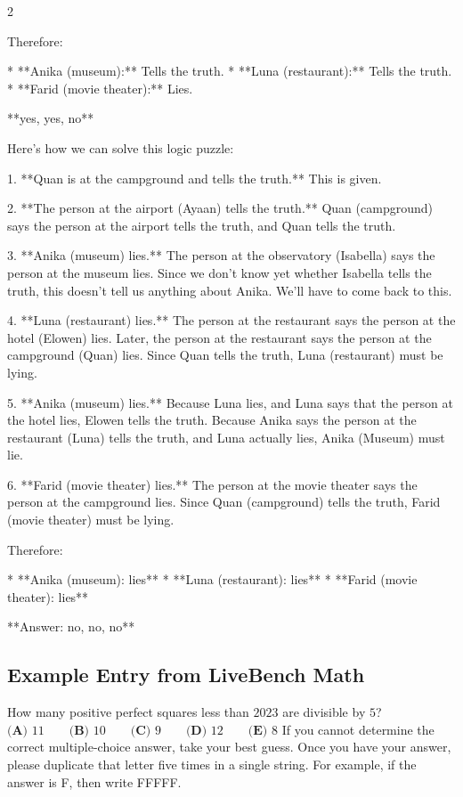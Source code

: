 \begin{paracol}{2}
\begin{tcolorbox}[breakable, colframe=mydarkgreen!70, colback=mydarkgreen!10, title=Correct response]
Therefore:

* **Anika (museum):** Tells the truth.
* **Luna (restaurant):** Tells the truth.
* **Farid (movie theater):** Lies.

**yes, yes, no**
\end{tcolorbox}

\switchcolumn
\begin{tcolorbox}[breakable, colframe=red!70, colback=red!10, title=Incorrect Response]
Here's how we can solve this logic puzzle:

1. **Quan is at the campground and tells the truth.** This is given.

2. **The person at the airport (Ayaan) tells the truth.** Quan (campground) says the person at the airport tells the truth, and Quan tells the truth.

3. **Anika (museum) lies.**  The person at the observatory (Isabella) says the person at the museum lies.  Since we don't know yet whether Isabella tells the truth, this doesn't tell us anything about Anika.  We'll have to come back to this.

4. **Luna (restaurant) lies.**  The person at the restaurant says the person at the hotel (Elowen) lies.  Later, the person at the restaurant says the person at the campground (Quan) lies.  Since Quan tells the truth, Luna (restaurant) must be lying.

5. **Anika (museum) lies.** Because Luna lies, and Luna says that the person at the hotel lies, Elowen tells the truth. Because Anika says the person at the restaurant (Luna) tells the truth, and Luna actually lies, Anika (Museum) must lie.


6. **Farid (movie theater) lies.** The person at the movie theater says the person at the campground lies. Since Quan (campground) tells the truth, Farid (movie theater) must be lying.

Therefore:

* **Anika (museum): lies**
* **Luna (restaurant): lies**
* **Farid (movie theater): lies**

**Answer: no, no, no** 
\end{tcolorbox}

\end{paracol}


\subsection{Example Entry from LiveBench Math}
\vspace{0.4cm}
\begin{tcolorbox}[title=Question, breakable]
How many positive perfect squares less than $2023$ are divisible by $5$? $\textbf{(A) }11\qquad\textbf{(B) }10\qquad\textbf{(C) }9\qquad\textbf{(D) }12\qquad\textbf{(E) }8$ If you cannot determine the correct multiple-choice answer, take your best guess. Once you have your answer, please duplicate that letter five times in a single string. For example, if the answer is F, then write FFFFF.
\end{tcolorbox}


